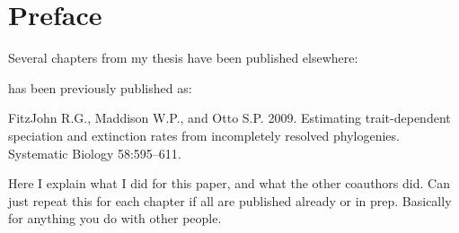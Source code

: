 \chapter*{Preface} %

Several chapters from my thesis have been published elsewhere:

\textsc{} has been previously published as:
%
\begin{previouspaper}
  FitzJohn R.G., Maddison W.P., and Otto S.P. 2009. Estimating
  trait-dependent speciation and extinction rates from incompletely
  resolved phylogenies.  Systematic Biology 58:595--611.
\end{previouspaper}
%
Here I explain what I did for this paper, and what the other coauthors did. Can just repeat this for each chapter if all are published already or in prep. Basically for anything you do with other people.

